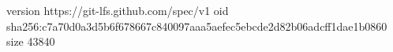 version https://git-lfs.github.com/spec/v1
oid sha256:c7a70d0a3d5b6f678667c840097aaa5aefec5ebcde2d82b06adcff1dae1b0860
size 43840
